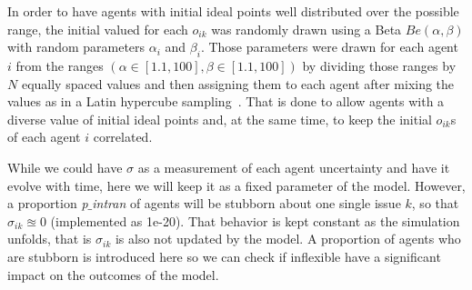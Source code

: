 \documentclass{article}
\begin{document}
In order to have agents with initial ideal points well distributed over the
possible range, the initial valued for each \(o_{ik}\) was randomly drawn
using a Beta \(Be(\alpha, \beta)\) with random parameters $\alpha_i$ and
$\beta_i$. Those parameters were drawn for each agent $i$ from the ranges \( (
\alpha \in [1.1, 100], \beta \in [1.1, 100] ) \) by dividing those ranges by
\(N\) equally spaced values and then assigning them to each agent after mixing
the values as in a Latin hypercube sampling~\cite{mckay2000comparison}. That is done to
allow agents with a diverse value of initial ideal points and, at the same time,
to keep the initial \(o_{ik}\)s of each agent $i$ correlated.


While we could have \(\sigma\) as a measurement of each agent uncertainty and
have it evolve with time, here we will keep it as a fixed parameter of the
model. However, a proportion \textit{p$\_$intran} of agents will be stubborn
about one single issue $k$, so that \(\sigma_{ik} \approxeq 0\) (implemented as
1e-20). That behavior is kept constant as the simulation unfolds, that is
$\sigma_{ik}$ is also not updated by the model. A proportion of agents who are
stubborn is introduced here so we can check if inflexible
\cite{galam05b,deffuant2002can,martinsgalam13a} have a significant impact on the
outcomes of the model.



\end{document}
